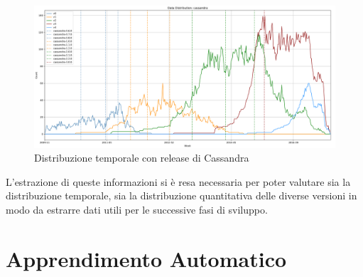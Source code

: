 \documentclass[%
    corpo=12pt,
    twoside,
    oldstyle,
    autoretitolo,
    greek,
    evenboxes,
]{toptesi}
\begin{document}
\begin{figure}[!ht]
  \includegraphics[width=\linewidth]{figure/cassandra_rele.png}
  \caption{Distribuzione temporale con release di Cassandra}
  \label{fig:cassandra_rele}
\end{figure}
L'estrazione di queste informazioni si è resa necessaria per poter valutare sia la distribuzione temporale, sia la distribuzione quantitativa delle diverse versioni in modo da estrarre dati utili per le successive fasi di sviluppo.


\chapter{Apprendimento Automatico}
\label{chap:ml}
\end{document}
